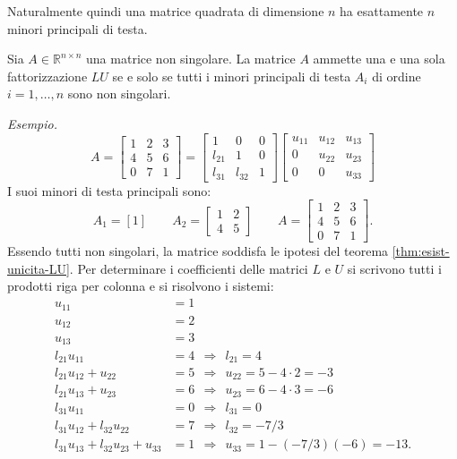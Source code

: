Naturalmente quindi una matrice quadrata di dimensione $n$ ha esattamente $n$ minori principali di testa.
\begin{theorem}
Sia $\displaystyle A\in \mathbb{R}^{n\times n}$ una matrice non singolare. La matrice $\displaystyle A$ ammette una e una sola fattorizzazione $\displaystyle LU$ se e solo se tutti i minori principali di testa $\displaystyle A_{i}$ di ordine $\displaystyle i=1,\dotsc ,n$ sono non singolari.
\label{thm:esist-unicita-LU}
\end{theorem}
\textit{Esempio.}
\begin{equation*}
A=\begin{bmatrix}
1 & 2 & 3\\
4 & 5 & 6\\
0 & 7 & 1
\end{bmatrix} =\begin{bmatrix}
1 & 0 & 0\\
l_{21} & 1 & 0\\
l_{31} & l_{32} & 1
\end{bmatrix}\begin{bmatrix}
u_{11} & u_{12} & u_{13}\\
0 & u_{22} & u_{23}\\
0 & 0 & u_{33}
\end{bmatrix}
\end{equation*}
I suoi minori di testa principali sono:
\begin{equation*}
A_{1} =[ 1] \qquad A_{2} =\begin{bmatrix}
1 & 2\\
4 & 5
\end{bmatrix} \qquad A=\begin{bmatrix}
1 & 2 & 3\\
4 & 5 & 6\\
0 & 7 & 1
\end{bmatrix}.
\end{equation*}
Essendo tutti non singolari, la matrice soddisfa le ipotesi del teorema \ref{thm:esist-unicita-LU}.
Per determinare i coefficienti delle matrici $L$ e $U$ si scrivono tutti i prodotti riga per colonna e si risolvono i sistemi:
\begin{align*}
u_{11} & =1\\
u_{12} & =2\\
u_{13} & =3\\
l_{21} u_{11} & =4\ \ \Rightarrow \ \ l_{21} =4\\
l_{21} u_{12} +u_{22} & =5\ \ \Rightarrow \ \ u_{22} =5-4\cdot 2=-3\\
l_{21} u_{13} +u_{23} & =6\ \ \Rightarrow \ \ u_{23} =6-4\cdot 3=-6\\
l_{31} u_{11} & =0\ \ \Rightarrow \ \ l_{31} =0\\
l_{31} u_{12} +l_{32} u_{22} & =7\ \ \Rightarrow \ \ l_{32} =-7/3\\
l_{31} u_{13} +l_{32} u_{23} +u_{33} & =1\ \ \Rightarrow \ \ u_{33} =1-( -7/3)( -6) =-13.
\end{align*}
